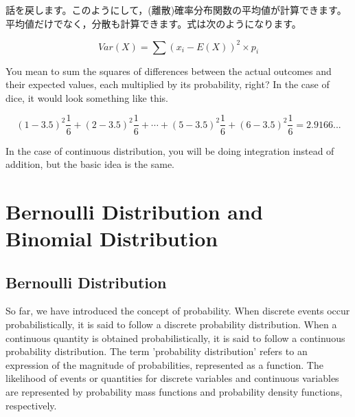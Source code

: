 \documentclass{ltjbook}
\begin{document}
話を戻します。このようにして，(離散)確率分布関数の平均値が計算できます。平均値だけでなく，分散も計算できます。式は次のようになります。

\[ Var(X) = \sum (x_i-E(X))^2 \times p_i \]

You mean to sum the squares of differences between the actual outcomes and their expected values, each multiplied by its probability, right? In the case of dice, it would look something like this.

\[
	(1-3.5)^2\frac{1}{6}+
	(2-3.5)^2\frac{1}{6}+
	\cdots+
	(5-3.5)^2\frac{1}{6}+
	(6-3.5)^2\frac{1}{6} = 2.9166...
\]

In the case of continuous distribution, you will be doing integration instead of addition, but the basic idea is the same.


\section{Bernoulli Distribution and Binomial Distribution}
\label{bernoulli_distribution}
\subsection{Bernoulli Distribution}
So far, we have introduced the concept of probability.
When discrete events occur probabilistically, it is said to follow a discrete probability distribution. When a continuous quantity is obtained probabilistically, it is said to follow a continuous probability distribution.
The term 'probability distribution' refers to an expression of the magnitude of probabilities, represented as a function. The likelihood of events or quantities for discrete variables and continuous variables are represented by probability mass functions and probability density functions, respectively.
\end{document}
